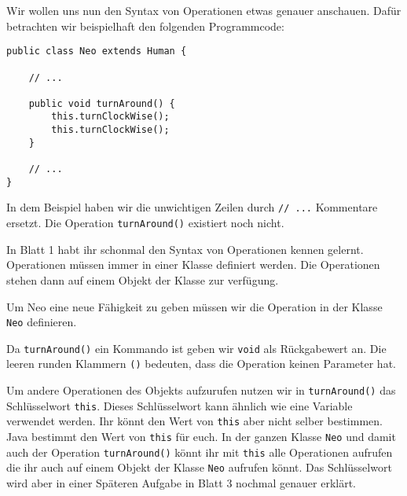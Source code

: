 \begin{Infobox}
    Wir wollen uns nun den Syntax von Operationen etwas genauer anschauen. 
    Dafür betrachten wir beispielhaft den folgenden Programmcode:

    \begin{lstlisting}[numbers=none]
public class Neo extends Human {

    // ...

    public void turnAround() {
        this.turnClockWise();
        this.turnClockWise();
    }

    // ...
}
    \end{lstlisting}

    In dem Beispiel haben wir die unwichtigen Zeilen durch \lstinline{// ...} Kommentare ersetzt.
    Die Operation \lstinline{turnAround()} existiert noch nicht.

    In Blatt 1 habt ihr schonmal den Syntax von Operationen kennen gelernt.
    Operationen müssen immer in einer Klasse definiert werden.
    Die Operationen stehen dann auf einem Objekt der Klasse zur verfügung.

    Um Neo eine neue Fähigkeit zu geben müssen wir die Operation in der Klasse \lstinline{Neo} definieren.

    Da \lstinline{turnAround()} ein Kommando ist geben wir \lstinline{void} als Rückgabewert an.
    Die leeren runden Klammern \lstinline{()} bedeuten, dass die Operation keinen Parameter hat.

    Um andere Operationen des Objekts aufzurufen nutzen wir in \lstinline{turnAround()} das Schlüsselwort \lstinline{this}.
    Dieses Schlüsselwort kann ähnlich wie eine Variable verwendet werden.
    Ihr könnt den Wert von \lstinline{this} aber nicht selber bestimmen.
    Java bestimmt den Wert von \lstinline{this} für euch.
    In der ganzen Klasse \lstinline{Neo} und damit auch der Operation \lstinline{turnAround()} könnt ihr mit \lstinline{this} alle Operationen aufrufen die ihr auch auf einem Objekt der Klasse \lstinline{Neo} aufrufen könnt.
    Das Schlüsselwort wird aber in einer Späteren Aufgabe in Blatt 3 nochmal genauer erklärt.

\end{Infobox}


